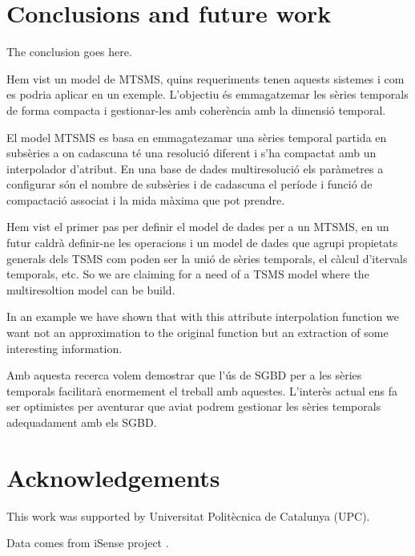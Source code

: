 \section{Conclusions and future work} 
The conclusion goes here.

Hem vist un model de MTSMS, quins requeriments tenen aquests sistemes i com es podria aplicar en un exemple. L'objectiu és emmagatzemar les sèries temporals de forma compacta i gestionar-les amb coherència amb la dimensió temporal. 


El model MTSMS es basa en emmagatezamar una sèries temporal partida en subsèries a on cadascuna té una resolució diferent i s'ha compactat amb un interpolador d'atribut. En una base de dades multiresolució els paràmetres a configurar són el nombre de subsèries i de cadascuna el període i funció de compactació associat i la mida màxima que pot prendre.

Hem vist el primer pas per definir el model de dades per a un MTSMS, en un futur caldrà definir-ne les operacions i un model de dades que agrupi propietats generals dels TSMS com poden ser la unió de sèries temporals, el càlcul d'itervals temporals, etc. So we are claiming for a need of a TSMS model where the multiresoltion model can be build.


 In an example
we have shown that with this attribute interpolation function we want
not an approximation to the original function but an extraction of
some interesting information.

Amb aquesta recerca volem demostrar que l'ús de SGBD per a les sèries temporals facilitarà enormement el treball amb aquestes.
L'interès actual ens fa ser optimistes per aventurar que aviat podrem gestionar les sèries temporals adequadament amb els SGBD.



\section*{Acknowledgements}

This work was supported by Universitat Polit\`{e}cnica de Catalunya (UPC).

Data comes from iSense project .









